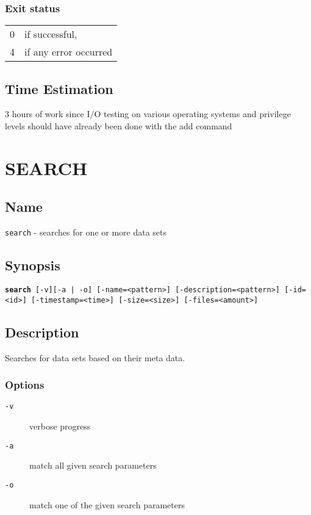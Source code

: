 \documentclass{article} %
\begin{document}
		\subsubsection*{Exit status}
		\begin{tabular}{ll}
			0 &  if successful,\\ 
			4 &  if any error occurred\\
		\end{tabular}
				\subsection*{Time Estimation}
				3 hours of work since I/O testing on various operating systems and privilege levels should have already been done with the add command \\
				\noindent
		\newpage
		
		\section*{SEARCH}
		\subsection*{Name}
		\texttt{search} - searches for one or more data sets
		\subsection*{Synopsis}
		\texttt{\textbf{search} [-v][-a | -o] [-name=<pattern>] [-description=<pattern>] [-id=<id>] [-timestamp=<time>] [-size=<size>] [-files=<amount>]}
		\subsection*{Description}
		Searches for data sets based on their meta data.
		\noindent
		\subsubsection*{Options}
		\begin{description}
			\item[\texttt{-v}] verbose progress
			\item[\texttt{-a}] match all given search parameters
			\item[\texttt{-o}] match one of the given search parameters
		\end{description}
\end{document}
